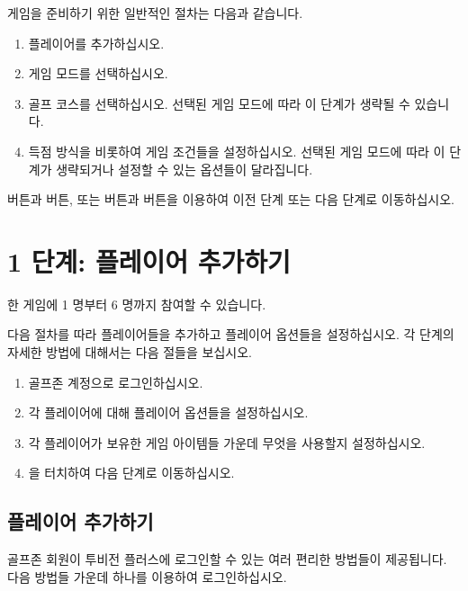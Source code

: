 \documentclass[10pt, openright, language=korean]{hzguide}
\begin{document}

게임을 준비하기 위한 일반적인 절차는 다음과 같습니다.

\begin{enumerate}
\item 플레이어를 추가하십시오.
\item 게임 모드를 선택하십시오.
\item 골프 코스를 선택하십시오. 선택된 게임 모드에 따라 이 단계가 생략될 수 있습니다.
\item 득점 방식을 비롯하여 게임 조건들을 설정하십시오. 선택된 게임 모드에 따라 이 단계가 생략되거나 설정할 수 있는 옵션들이 달라집니다.
\end{enumerate}

 버튼과  버튼, 또는  버튼과  버튼을 이용하여 이전 단계 또는 다음 단계로 이동하십시오.

\newpage
\section{1 단계: 플레이어 추가하기}

한 게임에 1 명부터 6 명까지 참여할 수 있습니다.


다음 절차를 따라 플레이어들을 추가하고 플레이어 옵션들을 설정하십시오.
각 단계의 자세한 방법에 대해서는 다음 절들을 보십시오.

\begin{enumerate}
\item 골프존 계정으로 로그인하십시오.
\item 각 플레이어에 대해 플레이어 옵션들을 설정하십시오.
\item 각 플레이어가 보유한 게임 아이템들 가운데 무엇을 사용할지 설정하십시오.
\item {}을 터치하여 다음 단계로 이동하십시오.
\end{enumerate}

\subsection{플레이어 추가하기}

골프존 회원이 투비전 플러스에 로그인할 수 있는 여러 편리한 방법들이 제공됩니다.
다음 방법들 가운데 하나를 이용하여 로그인하십시오.
\end{document}
